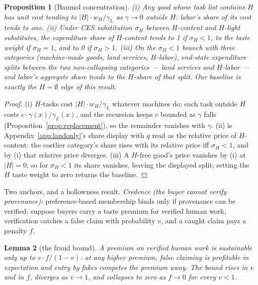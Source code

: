 \documentclass[12pt]{article}
\theoremstyle{plain}
\newtheorem{proposition}{Proposition}
\newtheorem{lemma}[proposition]{Lemma}
\begin{document}
\begin{proposition}[Baumol concentration]\label{prop:baumol}
(i) Any good whose task list contains $H$ has unit cost tending to $|H|\cdot w_H/\gamma _L$ as $\gamma \to 0$ outside $H$: labor's share of its cost tends to one. (ii) Under CES substitution $\sigma _H$ between $H$-content and $H$-light substitutes, the expenditure share of $H$-content tends to 1 if $\sigma _H < 1$, to the taste weight if $\sigma _H = 1$, and to 0 if $\sigma _H > 1$. (iii) On the $\sigma _H < 1$ branch with three categories (machine-made goods, land services, $H$-labor), end-state expenditure splits between the two non-collapsing categories --- land services and $H$-labor --- and labor's aggregate share tends to the $H$-share of that split. Our baseline is exactly the $H = \emptyset$ edge of this result.
\end{proposition}

\begin{proof}
(i) $H$-tasks cost $|H|\cdot w_H/\gamma _L$ whatever machines do; each task outside $H$ costs $c\cdot \gamma (x)/\gamma _L(x)$, and the recursion keeps $c$ bounded as $\gamma$ falls (Proposition~\ref{prop:replacement}), so the remainder vanishes with $\gamma$. (ii) is Appendix~\ref{app:landonly}'s share display with $q$ read as the relative price of $H$-content: the costlier category's share rises with its relative price iff $\sigma _H < 1$, and by (i) that relative price diverges. (iii) A $H$-free good's price vanishes by (i) at $|H| = 0$, so for $\sigma _H < 1$ its share vanishes, leaving the displayed split; setting the $H$ taste weight to zero returns the baseline.
\end{proof}

Two anchors, and a hollowness result. \emph{Credence (the buyer cannot verify provenance):} preference-based membership binds only if provenance can be verified: suppose buyers carry a taste premium for verified human work, verification catches a false claim with probability $v$, and a caught claim pays a penalty $f$.

\begin{lemma}[the fraud bound]\label{lem:fraud}
A premium on verified human work is sustainable only up to $v\cdot f/(1-v)$: at any higher premium, false claiming is profitable in expectation and entry by fakes competes the premium away. The bound rises in $v$ and in $f$, diverges as $v \to 1$, and collapses to zero as $f \to 0$ for every $v < 1$.
\end{lemma}
\end{document}
